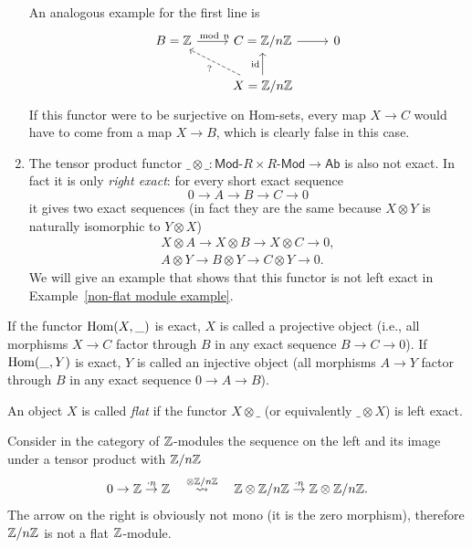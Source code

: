 \begin{example}
\begin{enumerate}
        An analogous example for the first line is
        \[\begin{tikzcd}
        B=\bbZ\arrow[r,"\mod n"] & C=\bbZ/n\bbZ\arrow[r] & 0 \\
         &X=\bbZ/n\bbZ\arrow[ul,dashed,"?"]\arrow[u,
        "\id"] &
        \end{tikzcd}\]
        If this functor were to be surjective on Hom-sets, every map $X\to C$ would have to come from a map $X\to B$, which is clearly false in this case.
        \item The tensor product functor $\_\otimes\_:\mathsf{Mod}\text{-}R\times R\text{-}\mathsf{Mod}\to \mathsf{Ab}$ is also not exact. In fact it is only \emph{right exact}: for every short exact sequence
        \[0\to A\to B\to C\to 0\]
        it gives two exact sequences (in fact they are the same because $X\otimes Y$ is naturally isomorphic to $Y\otimes X$)
        \begin{eqnarray} 
        X\otimes A\to X\otimes B\to X\otimes C\to 0,\\
        A\otimes Y\to B\otimes Y\to C\otimes Y\to 0.
        \end{eqnarray}
        We will give an example that shows that this functor is not left exact in Example~\ref{non-flat module example}.
    \end{enumerate}
\end{example}


\begin{defn}
    If the functor $\operatorname{Hom}(X,\_)$ is exact, $X$ is called a projective object (i.e., all morphisms $X\to C$ factor through $B$ in any exact sequence $B\to C\to 0$). If $\operatorname{Hom}(\_,Y)$ is exact, $Y$ is called an injective object (all morphisms $A\to Y$ factor through $B$ in any exact sequence $0\to A\to B$).
\end{defn}

\begin{defn}
    An object $X$ is called \emph{flat} if the functor $X\otimes\_$ (or equivalently $\_\otimes X$) is left exact.
\end{defn}

\begin{example}\label{non-flat module example}
    Consider in the category of $\mathbb{Z}$-modules the sequence on the left and its image under a tensor product with $\mathbb{Z}/n\mathbb{Z}$
    \[0\to \mathbb{Z}\overset{\cdot n}\to \mathbb{Z} \quad \overset{\otimes\mathbb{Z}/n\mathbb{Z}}\rightsquigarrow \quad \mathbb{Z}\otimes \mathbb{Z}/n\mathbb{Z}\overset{\cdot n}\to\mathbb{Z}\otimes \mathbb{Z}/n\mathbb{Z}.\]
    The arrow on the right is obviously not mono (it is the zero morphism), therefore $\mathbb{Z}/n\mathbb{Z}$ is not a flat $\mathbb{Z}$-module.
\end{example}

